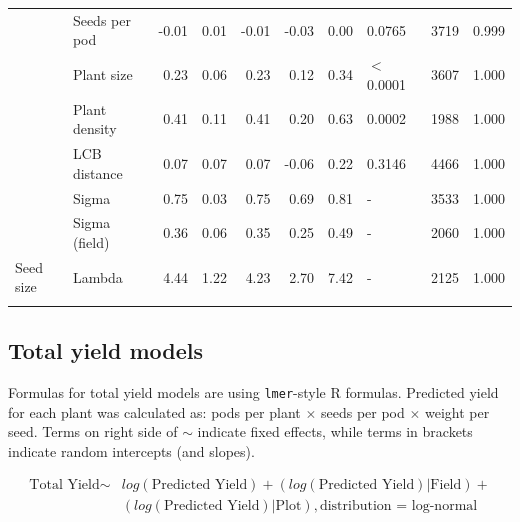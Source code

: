 \begin{longtable}{l|l|r|r|r|r|r|l|r|r}
\cline{2-10}
 & Seeds per pod & -0.01 & 0.01 & -0.01 & -0.03 & 0.00 & 0.0765 & 3719 & 0.999\\
\cline{2-10}
 & Plant size & 0.23 & 0.06 & 0.23 & 0.12 & 0.34 & $<$0.0001 & 3607 & 1.000\\
\cline{2-10}
 & Plant density & 0.41 & 0.11 & 0.41 & 0.20 & 0.63 & 0.0002 & 1988 & 1.000\\
\cline{2-10}
 & LCB distance & 0.07 & 0.07 & 0.07 & -0.06 & 0.22 & 0.3146 & 4466 & 1.000\\
\cline{2-10}
 & Sigma & 0.75 & 0.03 & 0.75 & 0.69 & 0.81 & - & 3533 & 1.000\\
\cline{2-10}
 & Sigma (field) & 0.36 & 0.06 & 0.35 & 0.25 & 0.49 & - & 2060 & 1.000\\
\cline{2-10}
\multirow{-9}{*}{\raggedright\arraybackslash Seed size} & Lambda & 4.44 & 1.22 & 4.23 & 2.70 & 7.42 & - & 2125 & 1.000\\
\hline
\label{tab:seedCoefs}
\end{longtable}
\endgroup{}


\clearpage

\subsection*{Total yield models}

Formulas for total yield models are  using \texttt{lmer}-style R formulas. Predicted yield for each plant was calculated as: pods per plant $\times$ seeds per pod $\times$ weight per seed. Terms on right side of $\sim$ indicate fixed effects, while terms in brackets indicate random intercepts (and slopes). 

\begin{align*}
    \text{Total Yield} \sim & log(\text{Predicted Yield}) + (log(\text{Predicted Yield})|\text{Field}) + \\
    & (log(\text{Predicted Yield})|\text{Plot}), \text{distribution = log-normal} \\
\end{align*}


